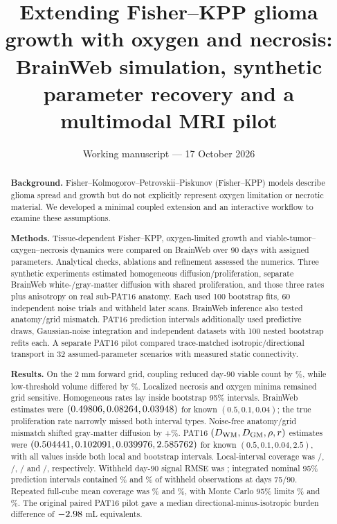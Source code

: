 \documentclass[11pt,a4paper]{article}
\title{Extending Fisher--KPP glioma growth with oxygen and necrosis:\\BrainWeb simulation, synthetic parameter recovery and a multimodal MRI pilot}
\author{}
\date{Working manuscript --- 17 October 2026}
\begin{document}
\maketitle
\begin{abstract}
\noindent\textbf{Background.} Fisher--Kolmogorov--Petrovskii--Piskunov (Fisher--KPP) models describe glioma spread and growth but do not explicitly represent oxygen limitation or necrotic material. We developed a minimal coupled extension and an interactive workflow to examine these assumptions.\par
\noindent\textbf{Methods.} Tissue-dependent Fisher--KPP, oxygen-limited growth and viable-tumor--oxygen--necrosis dynamics were compared on BrainWeb over 90 days with assigned parameters. Analytical checks, ablations and refinement assessed the numerics. Three synthetic experiments estimated homogeneous diffusion/proliferation, separate BrainWeb white-/gray-matter diffusion with shared proliferation, and those three rates plus anisotropy on real sub-PAT16 anatomy. Each used 100 bootstrap fits, 60 independent noise trials and withheld later scans. BrainWeb inference also tested anatomy/grid mismatch. PAT16 prediction intervals additionally used \PPDraws{} predictive draws, Gaussian-noise integration and \PPTrials{} independent datasets with 100 nested bootstrap refits each. A separate PAT16 pilot compared trace-matched isotropic/directional transport in 32 assumed-parameter scenarios with measured static connectivity.\par
\noindent\textbf{Results.} On the 2 mm forward grid, coupling reduced day-90 viable count by \CellReduction\%, while low-threshold volume differed by \VolumeReduction\%. Localized necrosis and oxygen minima remained grid sensitive. Homogeneous rates lay inside bootstrap 95\% intervals. BrainWeb estimates were $(0.49806,0.08264,0.03948)$ for known $(0.5,0.1,0.04)$; the true proliferation rate narrowly missed both interval types. Noise-free anatomy/grid mismatch shifted gray-matter diffusion by +\BWGrayStressShift\%. PAT16 $(D_{\rm WM},D_{\rm GM},\rho,r)$ estimates were $(0.504441,0.102091,0.039976,2.585762)$ for known $(0.5,0.1,0.04,2.5)$, with all values inside both local and bootstrap intervals. Local-interval coverage was \PRWhiteCoverage/\PRTrials{}, \PRGrayCoverage/\PRTrials{}, \PRRhoCoverage/\PRTrials{} and \PRRatioCoverage/\PRTrials{}, respectively. Withheld day-90 signal RMSE was \PRDayNinetyRMSE{}; integrated nominal 95\% prediction intervals contained \PRDaySeventyFivePredictionContainment\% and \PRDayNinetyPredictionContainment\% of withheld observations at days 75/90. Repeated full-cube mean coverage was \PPMixFullSeventyFive\% and \PPMixFullNinety\%, with Monte Carlo 95\% limits \PPMixFullSeventyFiveCI\% and \PPMixFullNinetyCI\%. The original paired PAT16 pilot gave a median directional-minus-isotropic burden difference of $-2.98$ mL equivalents.\par

\end{abstract}
\end{document}
